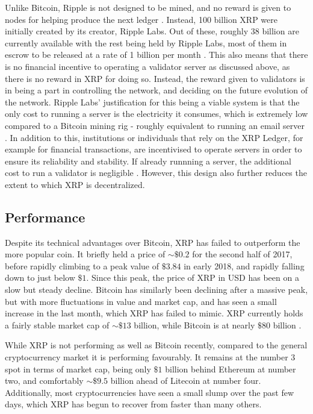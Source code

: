 \documentclass[11pt,a4paper]{article}
\begin{document}
	Unlike Bitcoin, Ripple is not designed to be mined, and no reward is given to nodes for helping produce the next ledger \cite{cointelegraph}. Instead, 100 billion XRP were initially created by its creator, Ripple Labs. Out of these, roughly 38 billion are currently available with the rest being held by Ripple Labs, most of them in escrow to be released at a rate of 1 billion per month \cite{finder}. This also means that there is no financial incentive to operating a validator server as discussed above, as there is no reward in XRP for doing so. Instead, the reward given to validators is in being a part in controlling the network, and deciding on the future evolution of the network. Ripple Labs' justification for this being a viable system is that the only cost to running a server is the electricity it consumes, which is extremely low compared to a Bitcoin mining rig - roughly equivalent to running an email server \cite{technicalFAQ}. In addition to this, institutions or individuals that rely on the XRP Ledger, for example for financial transactions, are incentivised to operate servers in order to ensure its reliability and stability. If already runnning a server, the additional cost to run a validator is negligible \cite{technicalFAQ}. However, this design also further reduces the extent to which XRP is decentralized.
	
	\subsection{Performance}
	
	Despite its technical advantages over Bitcoin, XRP has failed to outperform the more popular coin. It briefly held a price of $\sim\$0.2$ for the second half of 2017, before rapidly climbing to a peak value of $\$3.84$ in early 2018, and rapidly falling down to just below $\$1$. Since this peak, the price of XRP in USD has been on a slow but steady decline. Bitcoin has similarly been declining after a massive peak, but with more fluctuations in value and market cap, and has seen a small increase in the last month, which XRP has failed to mimic. XRP currently holds a fairly stable market cap of $\sim\$13$ billion, while Bitcoin is at nearly $\$80$ billion \cite{coinmarketcap}.
	
	While XRP is not performing as well as Bitcoin recently, compared to the general cryptocurrency market it is performing favourably. It remains at the number 3 spot in terms of market cap, being only $\$1$ billion behind Ethereum at number two, and comfortably $\sim\$9.5$ billion ahead of Litecoin at number four. Additionally, most cryptocurrencies have seen a small slump over the past few days, which XRP has begun to recover from faster than many others.
	
\end{document}

